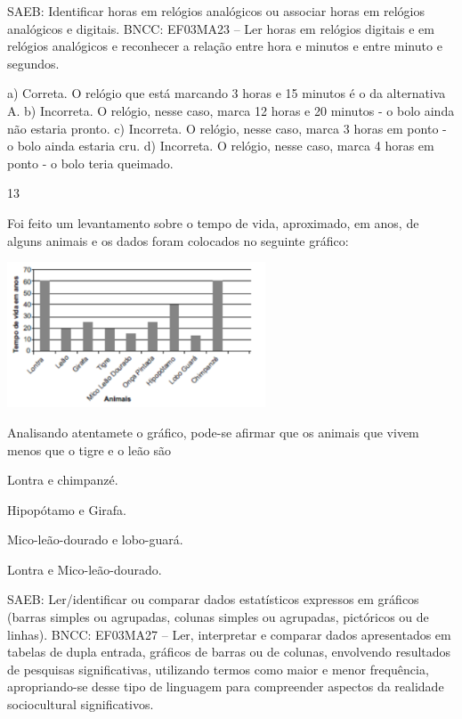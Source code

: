 \begin{multicols}{2}
\begin{enumerate}
{SAEB: Identificar horas em relógios analógicos ou associar horas em relógios analógicos e digitais.
BNCC: EF03MA23 – Ler horas em relógios digitais e em relógios analógicos e reconhecer a relação
entre hora e minutos e entre minuto e segundos.

a) Correta. O relógio que está marcando 3 horas e 15 minutos é o da alternativa A.
b) Incorreta. O relógio, nesse caso, marca 12 horas e 20 minutos - o bolo ainda não estaria pronto.
c) Incorreta. O relógio, nesse caso, marca 3 horas em ponto - o bolo ainda estaria cru.
d) Incorreta. O relógio, nesse caso, marca 4 horas em ponto - o bolo teria queimado.

\num{13}

Foi feito um levantamento sobre o tempo de vida, aproximado, em anos, de alguns animais e os dados foram colocados no seguinte gráfico:

\includegraphics[width=3.02451in,height=1.70004in]{media/image127.png}

Analisando atentamete o gráfico, pode-se afirmar que os animais que vivem menos que o tigre e o leão são

\begin{escolha}

\item
  Lontra e chimpanzé.
\item
  Hipopótamo e Girafa.
\item
  Mico-leão-dourado e lobo-guará.
\item
  Lontra e Mico-leão-dourado.
\end{escolha}

SAEB: Ler/identificar ou comparar dados estatísticos
expressos em gráficos (barras simples ou agrupadas, colunas simples ou agrupadas, pictóricos ou de linhas).
BNCC: EF03MA27 -- Ler, interpretar e comparar dados apresentados em tabelas de dupla entrada,
gráficos de barras ou de colunas, envolvendo resultados de pesquisas significativas, utilizando
termos como maior e menor frequência, apropriando-se desse tipo de linguagem para
compreender aspectos da realidade sociocultural significativos.

}
\end{enumerate}
\end{multicols}

